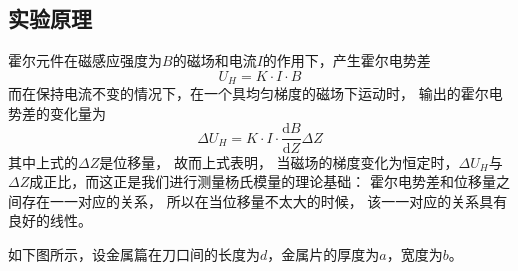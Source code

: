 \documentclass[UTF8]{article}
\theoremstyle{MyLineTheoremStyle} %
\theoremstyle{MyBlockTheoremStyle} %
\theoremstyle{MySubsubsectionStyle} %
\begin{document}
\subsection{实验原理}


霍尔元件在磁感应强度为$B$的磁场和电流$I$的作用下，产生霍尔电势差\begin{displaymath}U_H=K\cdot I\cdot B\end{displaymath}而在保持电流不变的情况下，在一个具均匀梯度的磁场下运动时，
输出的霍尔电势差的变化量为\begin{displaymath}\Delta U_H=K\cdot I\cdot \frac{\mathrm{d}B}{\mathrm{d}Z}\Delta Z\end{displaymath}其中上式的$\Delta Z$是位移量，
故而上式表明，
当磁场的梯度变化为恒定时，$\Delta U_H$与$\Delta Z$成正比，而这正是我们进行测量杨氏模量的理论基础：
霍尔电势差和位移量之间存在一一对应的关系，
所以在当位移量不太大的时候，
该一一对应的关系具有良好的线性。


如下图所示，设金属篇在刀口间的长度为$ d $，金属片的厚度为$ a $，宽度为$ b $。
\end{document}
